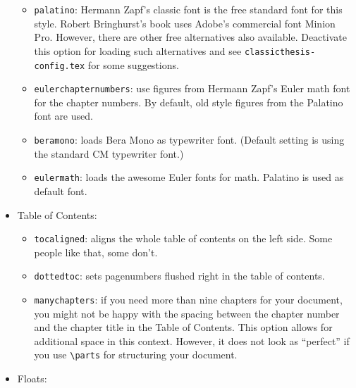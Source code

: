 \begin{itemize}
\begin{itemize}
              \item\texttt{palatino}: Hermann Zapf's classic font is the free standard font for this style. Robert Bringhurst's book uses Adobe's commercial font Minion Pro. However, there are other free alternatives also available. Deactivate this option for loading such alternatives and see \texttt{classicthesis-config.tex} for some suggestions.

              \item\texttt{eulerchapternumbers}: use figures from Hermann Zapf's
                    Euler math font for the chapter numbers. By default, old style
                    figures from the Palatino font are used.

              \item\texttt{beramono}: loads Bera Mono as typewriter font.
                    (Default setting is using the standard CM typewriter font.)

              \item\texttt{eulermath}: loads the awesome Euler fonts for math.
                    Pala\-tino is used as default font.

          \end{itemize}


    \item Table of Contents:
          \begin{itemize}
              \item\texttt{tocaligned}: aligns the whole table of contents on
                    the left side. Some people like that, some don't.

              \item\texttt{dottedtoc}: sets pagenumbers flushed right in the
                    table of contents.

              \item\texttt{manychapters}: if you need more than nine chapters for
                    your document, you might not be happy with the spacing between the
                    chapter number and the chapter title in the Table of Contents.
                    This option allows for additional space in this context.
                    However, it does not look as ``perfect'' if you use
                    \verb|\parts| for structuring your document.
          \end{itemize}

    \item Floats:
          \begin{itemize}


\end{itemize}
\end{itemize}
